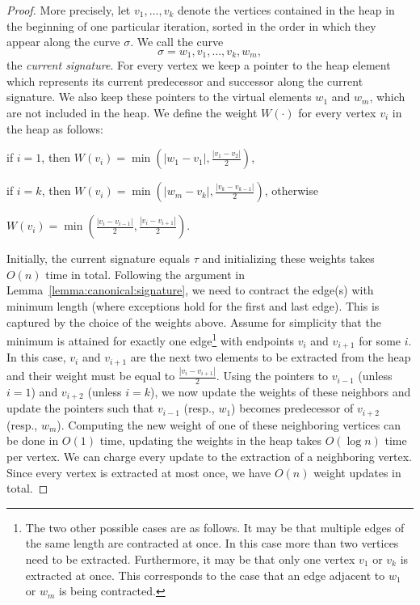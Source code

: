 \documentclass[11pt, letter]{article}
\newcommand{\lemref}[1]{Lemma~\ref{lemma:#1}}
\providecommand{\pth}[2][\!]{#1\left({#2}\right)}
\begin{document}
\begin{proof}
More precisely, let $v_1,\dots,v_k$ denote the vertices contained in the heap in the beginning of one particular iteration, sorted in the order in which they appear along the curve $\sigma$. We call the curve
\[ \sigma = w_1,v_1,\dots,v_k,w_m,\] 
the \emph{current signature}. For every vertex we keep a pointer to the heap element which represents its current predecessor and successor along the current signature. We also keep these pointers to the virtual elements $w_1$ and $w_m$, which are not included in the heap.  We define the weight $W(\cdot)$ for every vertex $v_i$ in the heap as follows:
\begin{compactenum}[(i)]
\item if $i=1$, then $W(v_i)=\min\pth{|w_1-v_1|, \frac{|v_1-v_{2}|}{2}}$,
\item if $i=k$, then $W(v_i)=\min\pth{|w_{m}-v_{k}|, \frac{|v_{k}-v_{k-1}|}{2}}$, otherwise
\item $W(v_i)=\min\pth{\frac{|v_i-v_{i-1}|}{2}, \frac{|v_i-v_{i+1}|}{2}}$.
\end{compactenum}
Initially, the current signature equals $\tau$ and initializing these weights takes $O(n)$ time in total. Following the argument in \lemref{canonical:signature}, we need to contract the edge(s) with minimum length (where exceptions hold for the first and last edge). This is captured by the choice of the weights above. Assume for simplicity that the minimum is attained for exactly one edge\footnote{The two other possible cases are as follows.  It may be that multiple edges of the same length are contracted at once. In this case more than two vertices need to be extracted. Furthermore, it may be that only one vertex $v_1$ or $v_k$ is extracted at once. This corresponds to the case that an edge adjacent to $w_1$ or $w_m$ is being contracted. } with endpoints $v_i$ and $v_{i+1}$ for some $i$. In this case, $v_{i}$ and $v_{i+1}$ are the next two elements to be extracted from the heap and their weight must be equal to $\frac{|v_i-v_{i+1}|}{2}$. Using the pointers to $v_{i-1}$ (unless $i=1$) and $v_{i+2}$ (unless $i=k$), we now update the weights of these neighbors and update the pointers such that $v_{i-1}$ (resp., $w_1$) becomes predecessor of $v_{i+2}$ (resp., $w_m$). Computing the new weight of one of these neighboring vertices can be done in $O(1)$ time, updating the weights in the heap takes $O(\log n)$ time per vertex. We can charge every update to the extraction of a neighboring vertex. Since every vertex is extracted at most once, we have $O(n)$ weight updates in total.
\end{proof}
\end{document}
